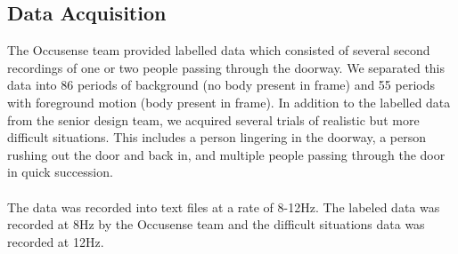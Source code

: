 \documentclass[12pt,oneside]{article} %
\begin{document}
\subsection{Data Acquisition}  %
The Occusense team provided labelled data which consisted of several second recordings of 
one or two people passing through the doorway. We separated this data into 86 periods of
background (no body present in frame) and 55 periods with foreground motion (body present in frame).
In addition to the labelled data from the senior design team, we acquired several trials of realistic but more
difficult situations. This includes a person lingering in the doorway, a person rushing out the door and back in, and multiple people passing through
the door in quick succession.
\\ \\
The data was recorded into text files at a rate of 8-12Hz. The labeled data was recorded at 8Hz
by the Occusense team and the difficult situations data was recorded at 12Hz.
\end{document}
